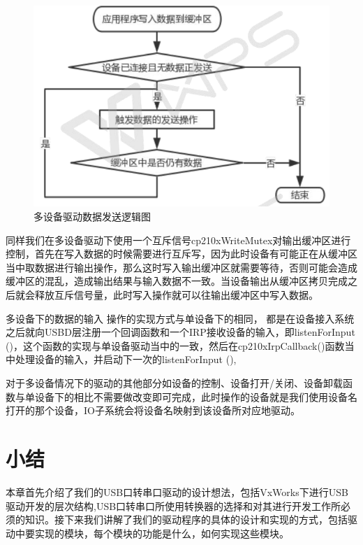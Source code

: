 \begin{figure}[!h]
\centering
\includegraphics[width=1.0\textwidth]{./graphics/MDevDataSend.pdf}
\caption{多设备驱动数据发送逻辑图}\label{fig:MDevDataSend}
\end{figure}

	同样我们在多设备驱动下使用一个互斥信号cp210xWriteMutex对输出缓冲区进行控制，首先在写入数据的时候需要进行互斥写，因为此时设备有可能正在从缓冲区当中取数据进行输出操作，那么这时写入输出缓冲区就需要等待，否则可能会造成缓冲区的混乱，造成输出结果与输入数据不一致。当设备输出从缓冲区拷贝完成之后就会释放互斥信号量，此时写入操作就可以往输出缓冲区中写入数据。

	
	多设备下的数据的输入  操作的实现方式与单设备下的相同， 都是在设备接入系统之后就向USBD层注册一个回调函数和一个IRP接收设备的输入，即listenForInput ()，这个函数的实现与单设备驱动当中的一致，然后在cp210xIrpCallback()函数当中处理设备的输入，并启动下一次的listenForInput (),


	对于多设备情况下的驱动的其他部分如设备的控制、设备打开/关闭、设备卸载函数与单设备下的相比不需要做改变即可完成，此时操作的设备就是我们使用设备名打开的那个设备，IO子系统会将设备名映射到该设备所对应地驱动。





\section{小结}
	本章首先介绍了我们的USB口转串口驱动的设计想法，包括VxWorks下进行USB驱动开发的层次结构,USB口转串口所使用转换器的选择和对其进行开发工作所必须的知识。接下来我们讲解了我们的驱动程序的具体的设计和实现的方式，包括驱动中要实现的模块，每个模块的功能是什么，如何实现这些模块。




